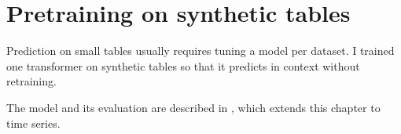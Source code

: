 \chapter{Pretraining on synthetic tables}\label{ch:pretraining}
Prediction on small tables usually requires tuning a model per dataset.
I trained one transformer on synthetic tables so that it predicts in context without retraining.

\begin{contribution}
\end{contribution}

The model and its evaluation are described in \citet{chen2026robust}, which extends this chapter to time series.
